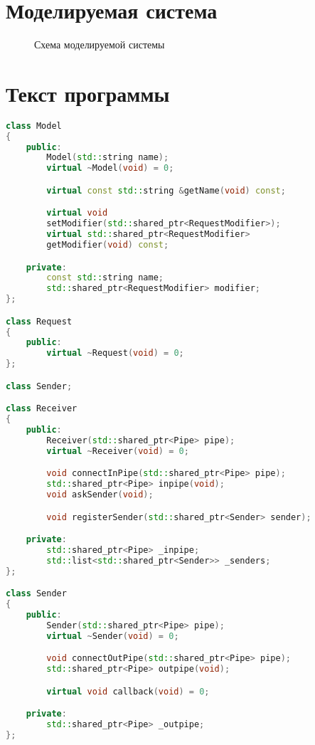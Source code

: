 \section*{Моделируемая система}

\begin{figure}[h]
    \centering
    \def\svgwidth{\textwidth}
    
    \caption{Схема моделируемой системы}
\end{figure}

\clearpage

\section*{Текст программы}
\begin{lstlisting}[caption={Реализация элементов системы}, language=c++]
class Model
{
    public:
        Model(std::string name);
        virtual ~Model(void) = 0;

        virtual const std::string &getName(void) const;

        virtual void
        setModifier(std::shared_ptr<RequestModifier>);
        virtual std::shared_ptr<RequestModifier>
        getModifier(void) const;

    private:
        const std::string name;
        std::shared_ptr<RequestModifier> modifier;
};

class Request
{
    public:
        virtual ~Request(void) = 0;
};

class Sender;

class Receiver
{
    public:
        Receiver(std::shared_ptr<Pipe> pipe);
        virtual ~Receiver(void) = 0;

        void connectInPipe(std::shared_ptr<Pipe> pipe);
        std::shared_ptr<Pipe> inpipe(void);
        void askSender(void);

        void registerSender(std::shared_ptr<Sender> sender);

    private:
        std::shared_ptr<Pipe> _inpipe;
        std::list<std::shared_ptr<Sender>> _senders;
};

class Sender
{
    public:
        Sender(std::shared_ptr<Pipe> pipe);
        virtual ~Sender(void) = 0;

        void connectOutPipe(std::shared_ptr<Pipe> pipe);
        std::shared_ptr<Pipe> outpipe(void);

        virtual void callback(void) = 0;

    private:
        std::shared_ptr<Pipe> _outpipe;
};


\end{lstlisting}
